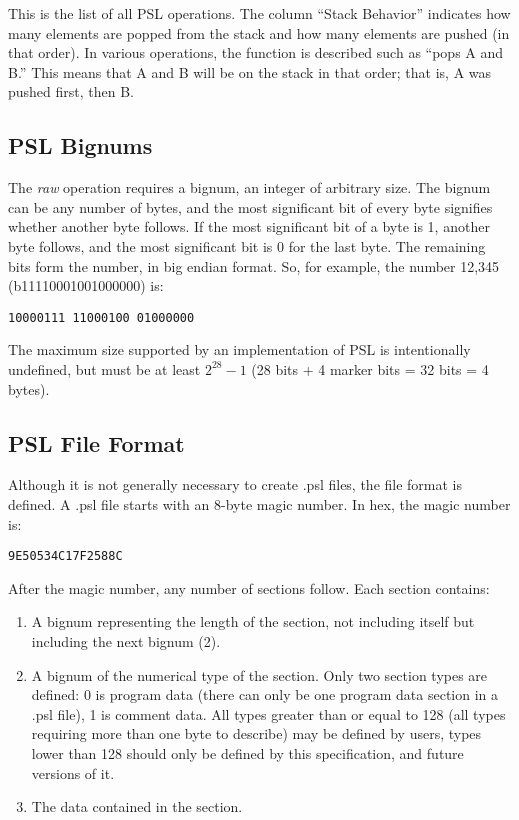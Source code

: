 This is the list of all PSL operations. The column “Stack Behavior” indicates how many elements are popped from the stack and how many elements are pushed (in that order). In various operations, the function is described such as “pops A and B.” This means that A and B will be on the stack in that order; that is, A was pushed first, then B.



\noindent
{}
%
%

\subsection{PSL Bignums}

The \textit{raw} operation requires a bignum, an integer of arbitrary size. The bignum can be any number of bytes, and the most significant bit of every byte signifies whether another byte follows. If the most significant bit of a byte is 1, another byte follows, and the most significant bit is 0 for the last byte. The remaining bits form the number, in big endian format. So, for example, the number 12,345 (b11110001001000000) is:

\noindent\texttt{10000111 11000100 01000000}

The maximum size supported by an implementation of PSL is intentionally undefined, but must be at least $2^{28}-1$ (28 bits + 4 marker bits = 32 bits = 4 bytes).



\subsection{PSL File Format}

Although it is not generally necessary to create .psl files, the file format is defined. A .psl file starts with an 8-byte magic number. In hex, the magic number is:

\noindent\texttt{9E50534C17F2588C}

After the magic number, any number of sections follow. Each section contains:

\begin{enumerate}
\item A bignum representing the length of the section, not including itself but including the next bignum (2).
\item A bignum of the numerical type of the section. Only two section types are defined: 0 is program data (there can only be one program data section in a .psl file), 1 is comment data. All types greater than or equal to 128 (all types requiring more than one byte to describe) may be defined by users, types lower than 128 should only be defined by this specification, and future versions of it.
\item The data contained in the section.
\end{enumerate}



